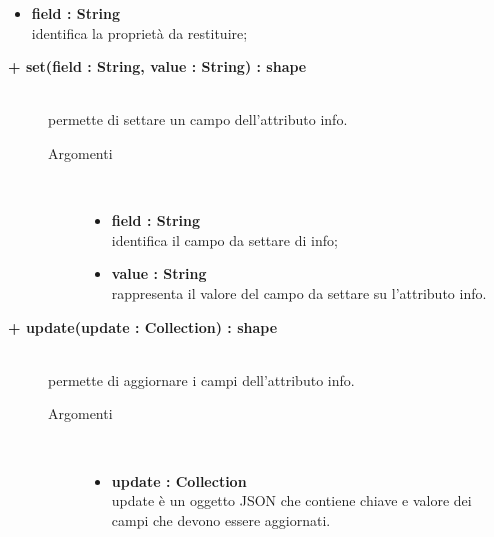 \begin{description}
\begin{description}
\begin{description}
\begin{itemize}
					\item \textbf{field : String			} \hfill \\
					identifica la proprietà da restituire;
				\end{itemize}
		\end{description}

\end{description}


		\begin{description}
		\item[\textbf{\color{blue}+ set(field : String, value : String) : shape			}] \hfill \\
			permette di settare un campo dell'attributo info.
			
		\begin{description}
			\item[Argomenti] \hfill \\
				\begin{itemize}
				
					\item \textbf{field : String			} \hfill \\
					identifica il campo da settare di info;
					\item \textbf{value : String			} \hfill \\
					rappresenta il valore del campo da settare su l'attributo info.
				\end{itemize}
		\end{description}

\end{description}

\begin{description}
		\item[\textbf{\color{blue}+ update(update : Collection) : shape			}] \hfill \\
			permette di aggiornare i campi dell'attributo info.
			
		\begin{description}
			\item[Argomenti] \hfill \\
				\begin{itemize}
				
					\item \textbf{update : Collection			} \hfill \\
					update è un oggetto JSON che contiene chiave e valore dei campi che devono essere aggiornati. 
				\end{itemize}
		\end{description}


\end{description}
\end{description}

